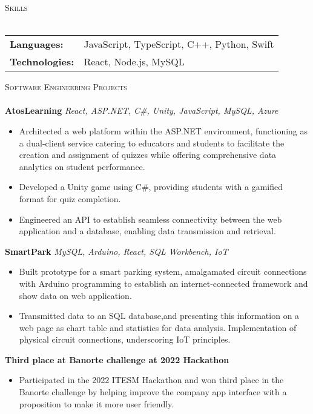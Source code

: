 \documentclass[a4paper]{article}
\newcommand{\lineunder} {
    \vspace*{-8pt} \\
    \hspace*{-18pt} \hrulefill \\
}
\newcommand{\header} [1] {
        {\hspace*{-18pt}\vspace*{6pt} \textsc{#1}}
    \vspace*{-6pt} \lineunder
}
\begin{document}
    \vspace{-1mm}
    \header{Skills}
    \vspace{1mm}

    \begin{tabular}{ l l }

        \textbf{Languages:} & JavaScript, TypeScript, C++, Python, Swift\\
        \vspace{1mm}
        \textbf{Technologies:} & React, Node.js, MySQL \\
    \end{tabular}
    \vspace{2mm}

    \header{Software Engineering Projects}
    \vspace{1mm}
    {\textbf{AtosLearning}} {\sl React, ASP.NET, C\#, Unity, JavaScript, MySQL, Azure}
    \vspace{-1mm}
    \begin{itemize} \itemsep -1pt
    \item Architected a web platform within the ASP.NET environment, functioning as a dual-client service catering to educators and students to facilitate the creation and assignment of quizzes while offering comprehensive data analytics on student performance.
    \item Developed a Unity game using C\#, providing students with a gamified format for quiz completion.
    \item Engineered an API to establish seamless connectivity between the web application and a database, enabling data transmission and retrieval.
    \end{itemize}
    {\textbf{SmartPark}} {\sl MySQL, Arduino, React, SQL Workbench, IoT}
    \vspace{-1mm}
    \begin{itemize} \itemsep -1pt
    \item Built prototype for a smart parking system, amalgamated circuit connections with Arduino programming to establish an internet-connected framework and show data on web application.
    \item Transmitted data to an SQL database,and presenting this information on a web page as chart table and statistics for data analysis. Implementation of physical circuit connections, underscoring IoT principles.
    \end{itemize}
    {\textbf{Third place at Banorte challenge at 2022 Hackathon}}
    \vspace{-1mm}
    \begin{itemize} \itemsep -1pt
    \item Participated in the 2022 ITESM Hackathon and won third place in the Banorte challenge by helping improve the company app interface with a proposition to make it more user friendly.
    \end{itemize}
\end{document}
